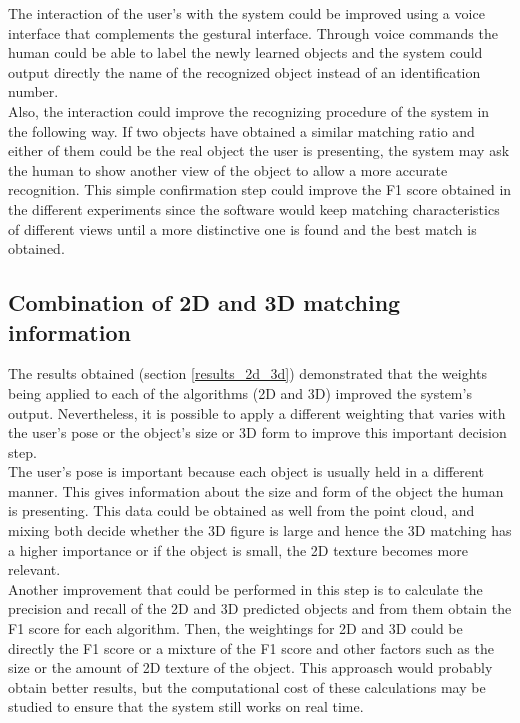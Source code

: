 	The interaction of the user's with the system could be improved using a voice interface that complements the gestural interface. 
	Through voice commands the human could be able to label the newly learned objects and the system could output directly the name of the recognized object instead of an identification number. 
	\\

	Also, the interaction could improve the recognizing procedure of the system in the following way. 
	If two objects have obtained a similar matching ratio and either of them could be the real object the user is presenting, the system may ask the human to show another view of the object to allow a more accurate recognition. 
	This simple confirmation step could improve the F1 score obtained in the different experiments since the software would keep matching characteristics of different views until a more distinctive one is found and the best match is obtained. 


	\subsection{Combination of 2D and 3D matching information}
	\label{future_decision}

	The results obtained (section \ref{results_2d_3d}) demonstrated that the weights being applied to each of the algorithms (2D and 3D) improved the system's output. 
	Nevertheless, it is possible to apply a different weighting that varies with the user's pose or the object's size or 3D form to improve this important decision step. 
	\\

	The user's pose is important because each object is usually held in a different manner. 
	This gives information about the size and form of the object the human is presenting. 
	This data could be obtained as well from the point cloud, and mixing both decide whether the 3D figure is large and hence the 3D matching has a higher importance or if the object is small, the 2D texture becomes more relevant.
	\\

	Another improvement that could be performed in this step is to calculate the precision and recall of the 2D and 3D predicted objects and from them obtain the F1 score for each algorithm. 
	Then, the weightings for 2D and 3D could be directly the F1 score or a mixture of the F1 score and other factors such as the size or the amount of 2D texture of the object.
	This approasch would probably obtain better results, but the computational cost of these calculations may be studied to ensure that the system still works on real time.  



